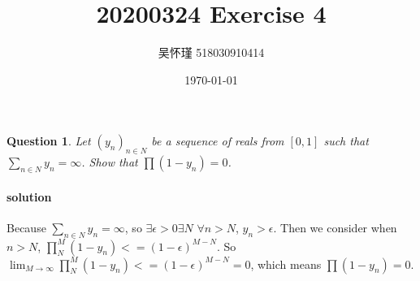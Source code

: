 \documentclass{article}
\title{20200324 Exercise 4}
\author{吴怀瑾 518030910414}
\date{\today}
\newtheorem{question}[theorem]{Question}
\begin{document}
    \maketitle
\section{}
\begin{question}{}{}
    Let $(y_n)_{n \in N}$ be a sequence of reals from $[0, 1]$ such that $\sum_{n \in N} y_n = \infty$. Show that $\prod (1−y_n)=0$.
\end{question}

\paragraph{solution}
    Because $\sum_{n \in N} y_n = \infty$, so $\exists \epsilon >0 \exists N $ $\forall  n > N$, $y_n > \epsilon$. Then we consider when $n > N$, $\prod_N^M (1-y_n) <= (1-\epsilon) ^{M-N}$.
    So $\lim_{M \to \infty} \prod_N^M (1-y_n) <= (1-\epsilon) ^{M-N} = 0$, which means $\prod (1−y_n)=0$.
\end{document}
